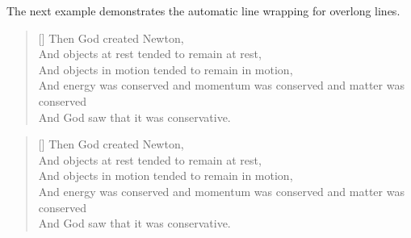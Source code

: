 \vspace{\onelineskip}

The next example demonstrates the automatic line wrapping for 
overlong lines.
\begin{lcode}
\settowidth{\versewidth}{And objects at rest tended to 
                         remain at rest}
\begin{verse}[\versewidth]
Then God created Newton, \\
And objects at rest tended to remain at rest, \\
And objects in motion tended to remain in motion, \\
And energy was conserved
   and momentum was conserved
   and matter was conserved \\
And God saw that it was conservative.
\end{verse}
\end{lcode}

\settowidth{\versewidth}{And objects at rest tended to remain at rest}
\begin{verse}[\versewidth]
Then God created Newton, \\
And objects at rest tended to remain at rest, \\
And objects in motion tended to remain in motion, \\
And energy was conserved
   and momentum was conserved
   and matter was conserved \\
And God saw that it was conservative.
\end{verse}

\vspace{\onelineskip}

